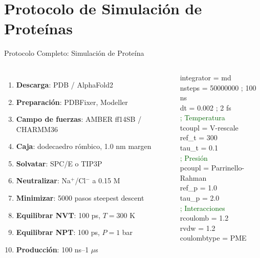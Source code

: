 \documentclass[aspectratio=169, 10pt]{beamer}
\begin{document}
\section{Protocolo de Simulación de Proteínas}

\begin{frame}{Protocolo Completo: Simulación de Proteína}

\begin{columns}[T]
\begin{enumerate}\small
  \item[\faCheckCircle] \textbf{Descarga}: PDB / AlphaFold2
  \item[\faCheckCircle] \textbf{Preparación}: PDBFixer, Modeller
  \item[\faCheckCircle] \textbf{Campo de fuerzas}: AMBER ff14SB / CHARMM36
  \item[\faCheckCircle] \textbf{Caja}: dodecaedro rómbico, 1.0 nm margen
  \item[\faCheckCircle] \textbf{Solvatar}: SPC/E o TIP3P
  \item[\faCheckCircle] \textbf{Neutralizar}: Na$^+$/Cl$^-$ a 0.15 M
  \item[\faCheckCircle] \textbf{Minimizar}: 5000 pasos steepest descent
  \item[\faCheckCircle] \textbf{Equilibrar NVT}: 100 ps, $T = 300$ K
  \item[\faCheckCircle] \textbf{Equilibrar NPT}: 100 ps, $P = 1$ bar
  \item[\faCheckCircle] \textbf{Producción}: 100 ns--1 $\mu$s
\end{enumerate}

\begin{tcolorbox}[formulabox, title={Parámetros típicos GROMACS}]
\scriptsize\ttfamily
integrator = md \\
nsteps = 50000000 ; 100 ns \\
dt = 0.002 ; 2 fs \\
\textcolor{DarkGreen}{; Temperatura} \\
tcoupl = V-rescale \\
ref\_t = 300 \\
tau\_t = 0.1 \\
\textcolor{DarkGreen}{; Presión} \\
pcoupl = Parrinello-Rahman \\
ref\_p = 1.0 \\
tau\_p = 2.0 \\
\textcolor{DarkGreen}{; Interacciones} \\
rcoulomb = 1.2 \\
rvdw = 1.2 \\
coulombtype = PME
\end{tcolorbox}
\end{columns}
\end{frame}
\end{document}
